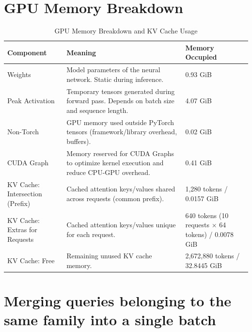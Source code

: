 \section{GPU Memory Breakdown}

\begin{table}[H]
\centering
\begin{tabular}{|p{4cm}|p{6cm}|p{3cm}|}
\hline
\textbf{Component} & \textbf{Meaning} & \textbf{Memory Occupied} \\
\hline
Weights & Model parameters of the neural network. Static during inference. & 0.93 GiB \\
\hline
Peak Activation & Temporary tensors generated during forward pass. Depends on batch size and sequence length. & 4.07 GiB \\
\hline
Non-Torch & GPU memory used outside PyTorch tensors (framework/library overhead, buffers). & 0.02 GiB \\
\hline
CUDA Graph & Memory reserved for CUDA Graphs to optimize kernel execution and reduce CPU-GPU overhead. & 0.41 GiB \\
\hline
KV Cache: Intersection (Prefix) & Cached attention keys/values shared across requests (common prefix). & 1,280 tokens / 0.0157 GiB \\
\hline
KV Cache: Extras for Requests & Cached attention keys/values unique for each request. & 640 tokens (10 requests × 64 tokens) / 0.0078 GiB \\
\hline
KV Cache: Free & Remaining unused KV cache memory. & 2,672,880 tokens / 32.8445 GiB \\
\hline
\end{tabular}
\caption{GPU Memory Breakdown and KV Cache Usage}
\label{tab:gpu_memory_breakdown}
\end{table}


\section{Merging queries belonging to the same family into a single batch}
\begin{table}[H]
\centering
{}
\caption{Comparison of Throughput (req/sec) when merging queries from the same family into a single batch vs not merging}
\label{tab:gpu_memory_breakdown_table}
\end{table}

